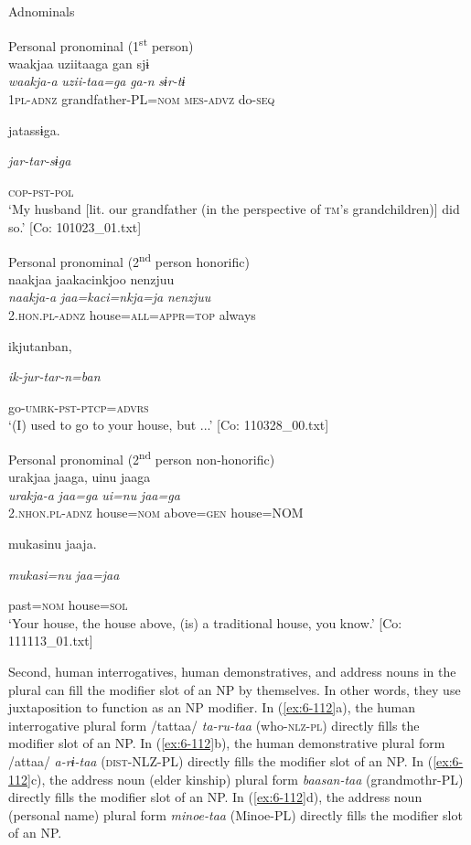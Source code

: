 \begin{table}
\ea\label{ex:6-111}
  Adnominals

 \ea Personal pronominal (1\textsuperscript{st} person)\\
{\TM}
\glll  waakjaa  uziitaaga  gan  sjɨ\\
\textit{waakja-a}  \textit{uzii-taa=ga}  \textit{ga-n}  \textit{sɨr-tɨ}\\
1\textsc{pl}-\textsc{adnz}  grandfather-PL=\textsc{nom}  \textsc{mes}-\textsc{advz}  do-\textsc{seq}

      jatassɨga.

      \textit{jar-tar-sɨga}

      \textsc{cop}-\textsc{pst}-\textsc{pol}\\
\glt ‘My husband [lit. our grandfather (in the perspective of \textsc{tm}’s grandchildren)] did so.’ [Co: 101023\_01.txt]
\z

\ex Personal pronominal (2\textsuperscript{nd} person honorific)\\
{\TM}
\glll  naakjaa  jaakacinkjoo  {\textbar}nenzjuu{\textbar}\\
\textit{naakja-a}  \textit{jaa=kaci=nkja=ja}  \textit{nenzjuu}\\
2.\textsc{hon}.\textsc{pl}-\textsc{adnz}  house=\textsc{all}=\textsc{appr}=\textsc{top}  always

      ikjutanban,

      \textit{ik-jur-tar-n=ban}

      go-\textsc{umrk}-\textsc{pst}-\textsc{ptcp}=\textsc{advrs}\\
\glt ‘(I) used to go to your house, but ...’ [Co: 110328\_00.txt]
\z

\ex Personal pronominal (2\textsuperscript{nd} person non-honorific)\\
{\TM}
\glll  urakjaa  jaaga,  uinu  jaaga\\
\textit{urakja-a}  \textit{jaa=ga}  \textit{ui=nu}  \textit{jaa=ga}\\
2.\textsc{nhon}.\textsc{pl}-\textsc{adnz}  house=\textsc{nom}  above=\textsc{gen}  house=NOM

      mukasinu  jaaja.

      \textit{mukasi=nu}  \textit{jaa=jaa}

      past=\textsc{nom}  house=\textsc{sol}\\
\glt ‘Your house, the house above, (is) a traditional house, you know.’ [Co: 111113\_01.txt]
\z

  Second, human interrogatives, human demonstratives, and address nouns in the plural can fill the modifier slot of an NP by themselves. In other words, they use juxtaposition to function as an NP modifier. In (\ref{ex:6-112}a), the human interrogative plural form /tattaa/ \textit{ta-ru-taa} (who-\textsc{nlz}-\textsc{pl}) directly fills the modifier slot of an NP. In (\ref{ex:6-112}b), the human demonstrative plural form /attaa/ \textit{a-rɨ-taa} (\textsc{dist}-NLZ-PL) directly fills the modifier slot of an NP. In (\ref{ex:6-112}c), the address noun (elder kinship) plural form \textit{baasan-taa} (grandmothr-PL) directly fills the modifier slot of an NP. In (\ref{ex:6-112}d), the address noun (personal name) plural form \textit{minoe-taa} (Minoe-PL) directly fills the modifier slot of an NP.


\end{table}
